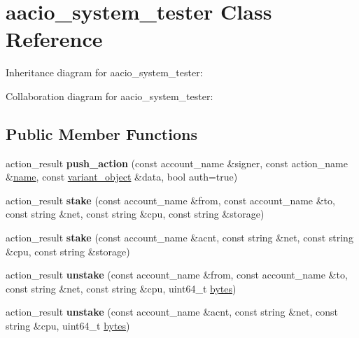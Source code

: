 \hypertarget{classaacio__system__tester}{}\section{aacio\+\_\+system\+\_\+tester Class Reference}
\label{classaacio__system__tester}


Inheritance diagram for aacio\+\_\+system\+\_\+tester\+:


Collaboration diagram for aacio\+\_\+system\+\_\+tester\+:
\subsection*{Public Member Functions}
\begin{DoxyCompactItemize}
\item 
\mbox{\label{classaacio__system__tester_a317c067d1a39678f06befae8eecf49eb}} 
action\+\_\+result {\bfseries push\+\_\+action} (const account\+\_\+name \&signer, const action\+\_\+name \&\mbox{\hyperlink{structaacio_1_1name}{name}}, const \mbox{\hyperlink{classfc_1_1variant__object}{variant\+\_\+object}} \&data, bool auth=true)
\item 
\mbox{\label{classaacio__system__tester_ad167999fb7af585aa88caec88bf9056d}} 
action\+\_\+result {\bfseries stake} (const account\+\_\+name \&from, const account\+\_\+name \&to, const string \&net, const string \&cpu, const string \&storage)
\item 
\mbox{\label{classaacio__system__tester_a1d734938f0abd017286aaf8563619d36}} 
action\+\_\+result {\bfseries stake} (const account\+\_\+name \&acnt, const string \&net, const string \&cpu, const string \&storage)
\item 
\mbox{\label{classaacio__system__tester_a2052f170579ff08fe01980e652b9cc45}} 
action\+\_\+result {\bfseries unstake} (const account\+\_\+name \&from, const account\+\_\+name \&to, const string \&net, const string \&cpu, uint64\+\_\+t \mbox{\hyperlink{classstd_1_1vector}{bytes}})
\item 
\mbox{\label{classaacio__system__tester_a8c04819fd8672f024ecbd88524cdda5f}} 
action\+\_\+result {\bfseries unstake} (const account\+\_\+name \&acnt, const string \&net, const string \&cpu, uint64\+\_\+t \mbox{\hyperlink{classstd_1_1vector}{bytes}})

\end{DoxyCompactItemize}
